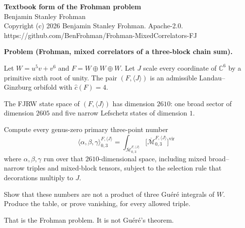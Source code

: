 \documentclass[11pt]{article}
\begin{document}
\begin{center}
{\Large\textbf{Textbook form of the Frohman problem}}\\[0.6em]
Benjamin Stanley Frohman\\[0.2em]
{\small Copyright (c) 2026 Benjamin Stanley Frohman. Apache-2.0.}\\[0.2em]
{\small https://github.com/BenFrohman/Frohman-MixedCorrelators-FJ}
\end{center}
\vspace{1.2em}
\noindent\textbf{Problem (Frohman, mixed correlators of a three-block chain sum).}
\vspace{0.6em}

\noindent Let $W=u^5v+v^6$ and $F=W\oplus W\oplus W$. Let $J$ scale every coordinate of $\mathbb{C}^6$ by a primitive sixth root of unity. The pair $(F,\langle J\rangle)$ is an admissible Landau--Ginzburg orbifold with $\hat{c}(F)=4$.

The FJRW state space of $(F,\langle J\rangle)$ has dimension $2610$: one broad sector of dimension $2605$ and five narrow Lefschetz states of dimension $1$.

Compute every genus-zero primary three-point number
\[
\langle\alpha,\beta,\gamma\rangle_{0,3}^{F,\langle J\rangle}
=
\int_{\overline{\mathcal{M}}_{0,3}^{F,\langle J\rangle}}
\bigl[\overline{\mathcal{M}}_{0,3}^{F,\langle J\rangle}\bigr]^{\mathrm{vir}}
\]
where $\alpha,\beta,\gamma$ run over that $2610$-dimensional space, including mixed broad--narrow triples and mixed-block tensors, subject to the selection rule that decorations multiply to $J$.

Show that these numbers are not a product of three Gu\'er\'e integrals of $W$. Produce the table, or prove vanishing, for every allowed triple.

\vspace{0.8em}
\noindent That is the Frohman problem. It is not Gu\'er\'e's theorem.
\end{document}
